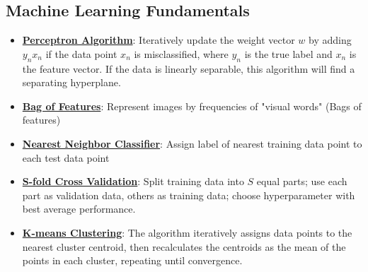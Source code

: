 \documentclass{article}%
\begin{document}
%
\subsection{Machine Learning Fundamentals}%
\label{subsec:MachineLearningFundamentals}%
\begin{itemize}[leftmargin=*]%
\item \href{https://purdue.brightspace.com/d2l/common/assets/pdfjs-d2l-dist/1.0.14-legacy/web/viewer.html?file=%2Fcontent%2Fenforced%2F1095467-wl.202510.CS.24300.001%2F05L2-ML Basics.pdf%3Fou%3D1095467&lang=en-us&container=d2l-fileviewer-rendered-pdf&fullscreen=d2l-fileviewer-rendered-pdf-dialog&height=667#page=30}{\textbf{Perceptron Algorithm}}: Iteratively update the weight vector $w$ by adding $y_nx_n$ if the data point $x_n$ is misclassified, where $y_n$ is the true label and $x_n$ is the feature vector. If the data is linearly separable, this algorithm will find a separating hyperplane.%
\item \href{https://purdue.brightspace.com/d2l/common/assets/pdfjs-d2l-dist/1.0.14-legacy/web/viewer.html?file=%2Fcontent%2Fenforced%2F1095467-wl.202510.CS.24300.001%2F07L2-Vision.pdf%3Fou%3D1095467&lang=en-us&container=d2l-fileviewer-rendered-pdf&fullscreen=d2l-fileviewer-rendered-pdf-dialog&height=667#page=16}{\textbf{Bag of Features}}: Represent images by frequencies of "visual words" (Bags of features)%
\item \href{https://purdue.brightspace.com/d2l/common/assets/pdfjs-d2l-dist/1.0.14-legacy/web/viewer.html?file=%2Fcontent%2Fenforced%2F1095467-wl.202510.CS.24300.001%2F07L2-Vision.pdf%3Fou%3D1095467&lang=en-us&container=d2l-fileviewer-rendered-pdf&fullscreen=d2l-fileviewer-rendered-pdf-dialog&height=667#page=30}{\textbf{Nearest Neighbor Classifier}}: Assign label of nearest training data point to each test data point%
\item \href{https://purdue.brightspace.com/d2l/common/assets/pdfjs-d2l-dist/1.0.14-legacy/web/viewer.html?file=%2Fcontent%2Fenforced%2F1095467-wl.202510.CS.24300.001%2F10L1-CrossValidation.pdf%3Fou%3D1095467&lang=en-us&container=d2l-fileviewer-rendered-pdf&fullscreen=d2l-fileviewer-rendered-pdf-dialog&height=667#page=25}{\textbf{S-fold Cross Validation}}: Split training data into $S$ equal parts; use each part as validation data, others as training data; choose hyperparameter with best average performance.%
\item \href{https://purdue.brightspace.com/d2l/common/assets/pdfjs-d2l-dist/1.0.14-legacy/web/viewer.html?file=%2Fcontent%2Fenforced%2F1095467-wl.202510.CS.24300.001%2F12L2-distance-clusters.pdf%3Fou%3D1095467&lang=en-us&container=d2l-fileviewer-rendered-pdf&fullscreen=d2l-fileviewer-rendered-pdf-dialog&height=667#page=22}{\textbf{K-means Clustering}}: The algorithm iteratively assigns data points to the nearest cluster centroid, then recalculates the centroids as the mean of the points in each cluster, repeating until convergence.%
\end{itemize}
\end{document}
